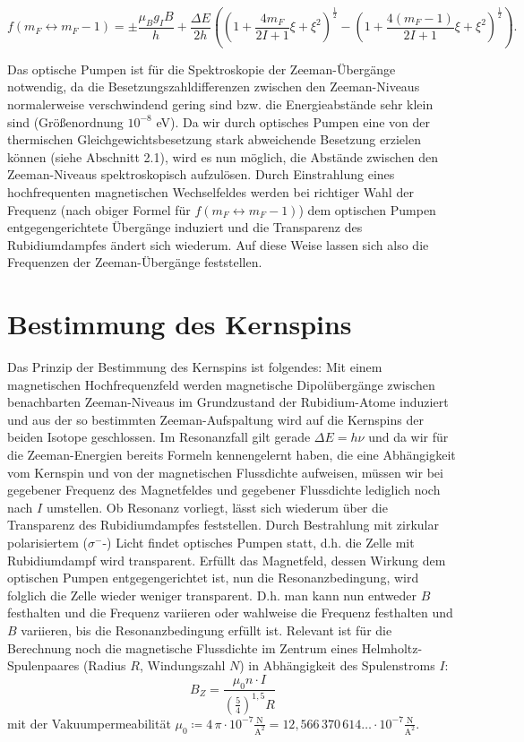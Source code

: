 \documentclass[bigchapter,colorback,accentcolor=tud4b,linedtoc,11pt]{tudreport}
\begin{document}
$$f(m_F \leftrightarrow m_F-1) = \pm \frac{\mu_B g_I B}{h} + \frac{\Delta E}{2h} \left( ( 1 + \frac{4 m_F}{2I+1} \xi + \xi^2 )^{\frac{1}{2}} - ( 1 + \frac{4 (m_F - 1)}{2I+1} \xi + \xi^2 )^{\frac{1}{2}} \right).$$

Das optische Pumpen ist für die Spektroskopie der Zeeman-Übergänge notwendig, da die Besetzungszahldifferenzen zwischen den Zeeman-Niveaus normalerweise verschwindend gering sind bzw. die Energieabstände sehr klein sind (Größenordnung $10^{-8}$ eV). Da wir durch optisches Pumpen eine von der thermischen Gleichgewichtsbesetzung stark abweichende Besetzung erzielen können (siehe Abschnitt 2.1), wird es nun möglich, die Abstände zwischen den Zeeman-Niveaus spektroskopisch aufzulösen. Durch Einstrahlung eines hochfrequenten magnetischen Wechselfeldes werden bei richtiger Wahl der Frequenz (nach obiger Formel für $f(m_F \leftrightarrow m_F-1)$) dem optischen Pumpen entgegengerichtete Übergänge induziert und die Transparenz des Rubidiumdampfes ändert sich wiederum. Auf diese Weise lassen sich also die Frequenzen der Zeeman-Übergänge feststellen.

\section{Bestimmung des Kernspins}

Das Prinzip der Bestimmung des Kernspins ist folgendes: Mit einem magnetischen Hochfrequenzfeld werden magnetische Dipolübergänge zwischen benachbarten Zeeman-Niveaus im Grundzustand der Rubidium-Atome induziert und aus der so bestimmten Zeeman-Aufspaltung wird auf die Kernspins der beiden Isotope geschlossen. Im Resonanzfall gilt gerade $\Delta E = h \nu$ und da wir für die Zeeman-Energien bereits Formeln kennengelernt haben, die eine Abhängigkeit vom Kernspin und von der magnetischen Flussdichte aufweisen, müssen wir bei gegebener Frequenz des Magnetfeldes und gegebener Flussdichte lediglich noch nach $I$ umstellen. Ob Resonanz vorliegt, lässt sich wiederum über die Transparenz des Rubidiumdampfes feststellen. Durch Bestrahlung mit zirkular polarisiertem ($\sigma^-$-) Licht findet optisches Pumpen statt, d.h. die Zelle mit Rubidiumdampf wird transparent. Erfüllt das Magnetfeld, dessen Wirkung dem optischen Pumpen entgegengerichtet ist, nun die Resonanzbedingung, wird folglich die Zelle wieder weniger transparent. D.h. man kann nun entweder $B$ festhalten und die Frequenz variieren oder wahlweise die Frequenz festhalten und $B$ variieren, bis die Resonanzbedingung erfüllt ist. Relevant ist für die Berechnung noch die magnetische Flussdichte im Zentrum eines Helmholtz-Spulenpaares (Radius $R$, Windungszahl $N$) in Abhängigkeit des Spulenstroms $I$:
$$B_Z = \frac{\mu_0 n \cdot I}{{\left( \frac{5}{4}\right)}^{1,5} R}$$
mit der Vakuumpermeabilität $\mu_0 \coloneqq 4\,\pi \cdot 10^{-7} \frac{\mathrm{N}}{\mathrm{A}^2} = 12{,}566\,370\,614\ldots \cdot 10^{-7} \frac{\mathrm{N}}{\mathrm{A}^2}$.
\end{document}
